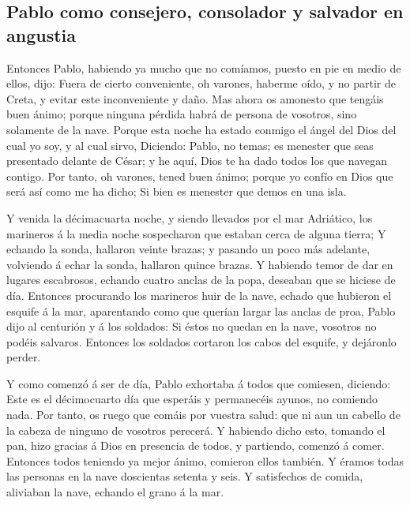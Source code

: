 \hypertarget{pablo-como-consejero-consolador-y-salvador-en-angustia}{%
\subsection{Pablo como consejero, consolador y salvador en
angustia}\label{pablo-como-consejero-consolador-y-salvador-en-angustia}}

 Entonces Pablo, habiendo ya mucho que no comíamos,
puesto en pie en medio de ellos, dijo: Fuera de cierto conveniente, oh
varones, haberme oído, y no partir de Creta, y evitar este inconveniente
y daño.  Mas ahora os amonesto que tengáis buen ánimo;
porque ninguna pérdida habrá de persona de vosotros, sino solamente de
la nave.  Porque esta noche ha estado conmigo el ángel
del Dios del cual yo soy, y al cual sirvo,  Diciendo:
Pablo, no temas; es menester que seas presentado delante de César; y he
aquí, Dios te ha dado todos los que navegan contigo.  Por
tanto, oh varones, tened buen ánimo; porque yo confío en Dios que será
así como me ha dicho;  Si bien es menester que demos en
una isla.

 Y venida la décimacuarta noche, y siendo llevados por el
mar Adriático, los marineros á la media noche sospecharon que estaban
cerca de alguna tierra;  Y echando la sonda, hallaron
veinte brazas; y pasando un poco más adelante, volviendo á echar la
sonda, hallaron quince brazas.  Y habiendo temor de dar
en lugares escabrosos, echando cuatro anclas de la popa, deseaban que se
hiciese de día.  Entonces procurando los marineros huir
de la nave, echado que hubieron el esquife á la mar, aparentando como
que querían largar las anclas de proa,  Pablo dijo al
centurión y á los soldados: Si éstos no quedan en la nave, vosotros no
podéis salvaros.  Entonces los soldados cortaron los
cabos del esquife, y dejáronlo perder.

 Y como comenzó á ser de día, Pablo exhortaba á todos que
comiesen, diciendo: Este es el décimocuarto día que esperáis y
permanecéis ayunos, no comiendo nada.  Por tanto, os
ruego que comáis por vuestra salud: que ni aun un cabello de la cabeza
de ninguno de vosotros perecerá.  Y habiendo dicho esto,
tomando el pan, hizo gracias á Dios en presencia de todos, y partiendo,
comenzó á comer.  Entonces todos teniendo ya mejor ánimo,
comieron ellos también.  Y éramos todas las personas en
la nave doscientas setenta y seis.  Y satisfechos de
comida, aliviaban la nave, echando el grano á la mar.

